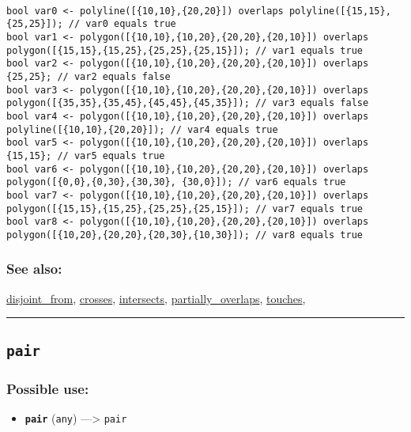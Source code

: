 \documentclass[]{book}
\providecommand{\tightlist}{%
  \setlength{\itemsep}{0pt}\setlength{\parskip}{0pt}}
\theoremstyle{definition}
\theoremstyle{definition}
\theoremstyle{definition}
\theoremstyle{remark}
\begin{document}
\begin{verbatim}
 
bool var0 <- polyline([{10,10},{20,20}]) overlaps polyline([{15,15},{25,25}]); // var0 equals true 
bool var1 <- polygon([{10,10},{10,20},{20,20},{20,10}]) overlaps polygon([{15,15},{15,25},{25,25},{25,15}]); // var1 equals true 
bool var2 <- polygon([{10,10},{10,20},{20,20},{20,10}]) overlaps {25,25}; // var2 equals false 
bool var3 <- polygon([{10,10},{10,20},{20,20},{20,10}]) overlaps polygon([{35,35},{35,45},{45,45},{45,35}]); // var3 equals false 
bool var4 <- polygon([{10,10},{10,20},{20,20},{20,10}]) overlaps polyline([{10,10},{20,20}]); // var4 equals true 
bool var5 <- polygon([{10,10},{10,20},{20,20},{20,10}]) overlaps {15,15}; // var5 equals true 
bool var6 <- polygon([{10,10},{10,20},{20,20},{20,10}]) overlaps polygon([{0,0},{0,30},{30,30}, {30,0}]); // var6 equals true 
bool var7 <- polygon([{10,10},{10,20},{20,20},{20,10}]) overlaps polygon([{15,15},{15,25},{25,25},{25,15}]); // var7 equals true 
bool var8 <- polygon([{10,10},{10,20},{20,20},{20,10}]) overlaps polygon([{10,20},{20,20},{20,30},{10,30}]); // var8 equals true
\end{verbatim}

\subsubsection{See also:}\label{see-also-157}

\href{OperatorsDH\#disjoint_from}{disjoint\_from},
\href{OperatorsBC\#crosses}{crosses},
\href{OperatorsIM\#intersects}{intersects},
\href{OperatorsNR\#partially_overlaps}{partially\_overlaps},
\href{OperatorsSZ\#touches}{touches},

\begin{center}\rule{0.5\linewidth}{\linethickness}\end{center}

\subsection{\texorpdfstring{\texttt{pair}}{pair}}\label{pair}

\subsubsection{Possible use:}\label{possible-use-392}

\begin{itemize}
\tightlist
\item
  \textbf{\texttt{pair}} (\texttt{any}) ---\textgreater{} \texttt{pair}
\end{itemize}
\end{document}
